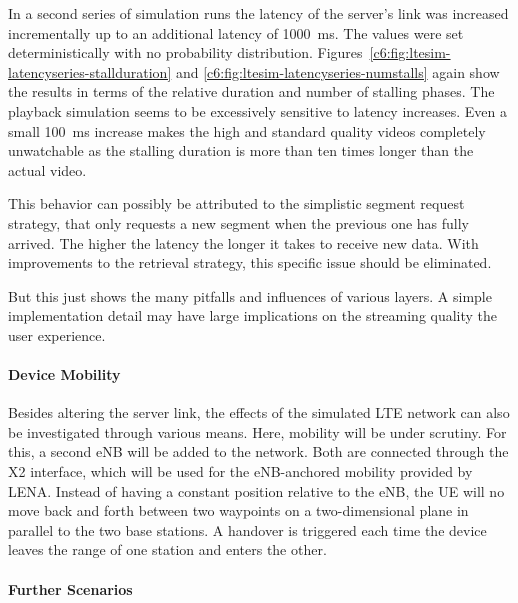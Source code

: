 In a second series of simulation runs the latency of the server's link was increased incrementally up to an additional latency of \SI{1000}{\milli\second}. The values were set deterministically with no probability distribution. Figures~\ref{c6:fig:ltesim-latencyseries-stallduration} and \ref{c6:fig:ltesim-latencyseries-numstalls} again show the results in terms of the relative duration and number of stalling phases. The playback simulation seems to be excessively sensitive to latency increases. Even a small \SI{100}{\milli\second} increase makes the high and standard quality videos completely unwatchable as the stalling duration is more than ten times longer than the actual video.

This behavior can possibly be attributed to the simplistic segment request strategy, that only requests a new segment when the previous one has fully arrived. The higher the latency the longer it takes to receive new data. With improvements to the retrieval strategy, this specific issue should be eliminated. 

But this just shows the many pitfalls and influences of various layers. A simple implementation detail may have large implications on the streaming quality the user experience.

\paragraph{Device Mobility}

Besides altering the server link, the effects of the simulated \gls{LTE} network can also be investigated through various means. Here, mobility will be under scrutiny. For this, a second \gls{eNB} will be added to the network. Both are connected through the X2 interface, which will be used for the \gls{eNB}-anchored mobility provided by LENA. Instead of having a constant position relative to the \gls{eNB}, the \gls{UE} will no move back and forth between two waypoints on a two-dimensional plane in parallel to the two base stations. A handover is triggered each time the device leaves the range of one station and enters the other. 



\paragraph{Further Scenarios}

